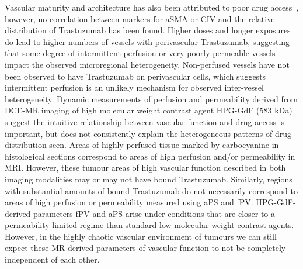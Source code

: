 Vascular maturity and architecture has also been attributed to poor drug access~\cite{Goel:2011ku}, however, no correlation between markers for aSMA or CIV and the relative distribution of Trastuzumab has been found.
Higher doses and longer exposures do lead to higher numbers of vessels with perivascular Trastuzumab, suggesting that some degree of intermittent perfusion or very poorly permeable vessels impact the observed microregional heterogeneity.
Non-perfused vessels have not been observed to have Trastuzumab on perivascular cells, which suggests intermittent perfusion is an unlikely mechanism for observed inter-vessel heterogeneity.
Dynamic measurements of perfusion and permeability derived from DCE-MR imaging of high molecular weight contrast agent \acs{HPG-GdF} (583 kDa) suggest the intuitive relationship between vascular function and drug access is important, but does not consistently explain the heterogeneous patterns of drug distribution seen.
Areas of highly perfused tissue marked by carbocyanine in histological sections correspond to areas of high perfusion and/or permeability in MRI.
However, these tumour areas of high vascular function described in both imaging modalities may or may not have bound Trastuzumab.
Similarly, regions with substantial amounts of bound Trastuzumab do not necessarily correspond to areas of high perfusion or permeability measured using \acs{aPS} and \acs{fPV}.
HPG-GdF-derived parameters \acs{fPV} and \acs{aPS} arise under conditions that are closer to a permeability-limited regime than standard low-molecular weight contrast agents.
However, in the highly chaotic vascular environment of tumours we can still expect these MR-derived parameters of vascular function to not be completely independent of each other.


